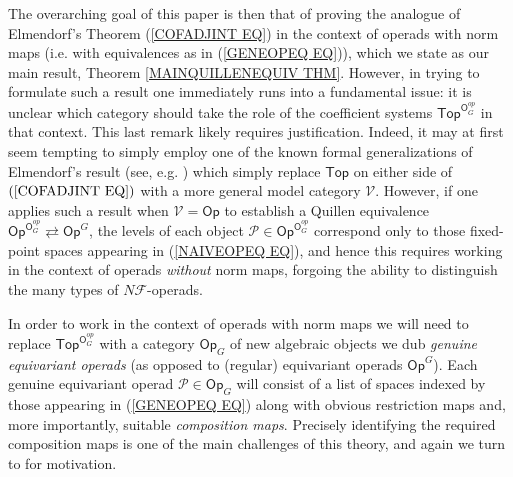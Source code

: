 \documentclass[a4paper,10pt]{article}%
\begin{document}
The overarching goal of this paper is then that of proving the analogue of Elmendorf's Theorem (\ref{COFADJINT EQ})
in the context of operads with norm maps (i.e. with equivalences as in (\ref{GENEOPEQ EQ})),
which we state as our main result, Theorem \ref{MAINQUILLENEQUIV THM}.
However, in trying to formulate such a result one immediately runs into a fundamental issue: 
it is unclear which category should take the role of the coefficient systems $\mathsf{Top}^{\mathsf{O}_G^{op}}$ in that context.
This last remark likely requires justification. 
Indeed, it may at first seem tempting to simply 
employ one of the known formal generalizations of Elmendorf's result (see, e.g. \cite[Thm. 3.17]{Ste16}) which simply replace
$\mathsf{Top}$ on either side of $(\ref{COFADJINT EQ})$
with a more general model category $\mathcal{V}$.
However, if one applies such a result when $\mathcal{V}=\mathsf{Op}$
to establish a Quillen equivalence
$\mathsf{Op}^{\mathsf{O}_G^{op}}
\rightleftarrows
\mathsf{Op}^G$, 
the levels of each object
$\mathcal{P} \in \mathsf{Op}^{\mathsf{O}_G^{op}}$
correspond only to those fixed-point spaces appearing in (\ref{NAIVEOPEQ EQ}),
and hence this requires working in the context of operads \textit{without} norm maps,
forgoing the ability to distinguish 
the many types of $N \mathcal{F}$-operads.

In order to work in the context of operads with norm maps we will need to replace 
$\mathsf{Top}^{\mathsf{O}_G^{op}}$
with a category
$\mathsf{Op}_G$
of new algebraic objects we dub 
\textit{genuine equivariant operads}
(as opposed to (regular) equivariant operads
$\mathsf{Op}^G$).
Each genuine equivariant operad 
$\mathcal{P} \in \mathsf{Op}_G$
will consist of a list of spaces indexed by those appearing in (\ref{GENEOPEQ EQ}) along with obvious restriction maps and, more importantly, 
suitable \textit{composition maps}. Precisely identifying the required composition maps is one of the main challenges of this theory, and again we turn to \cite{BH15} for motivation.
\end{document}
